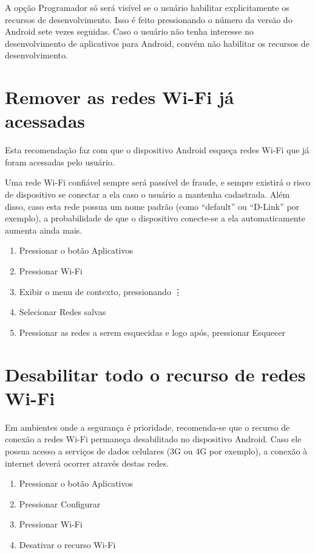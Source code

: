 A op\c c\~ao Programador s\'o ser\'a vis\'ivel se o usu\'ario habilitar explicitamente os recursos de desenvolvimento. Isso \'e feito pressionando o n\'umero da vers\~ao do Android sete vezes seguidas. Caso o usu\'ario n\~ao tenha interesse no desenvolvimento de aplicativos para Android, conv\'em n\~ao habilitar os recursos de desenvolvimento.

\section{Remover as redes Wi-Fi j\'a acessadas}

Esta recomenda\c c\~ao faz com que o dispositivo Android esque\c ca redes Wi-Fi que j\'a foram acessadas pelo usu\'ario. 

Uma rede Wi-Fi confi\'avel sempre ser\'a pass\'ivel de fraude, e sempre existir\'a o risco de dispositivo se conectar a ela caso o usu\'ario a mantenha cadastrada. Al\'em disso, caso esta rede possua um nome padr\~ao (como ``default'' ou ``D-Link'' por exemplo), a probabilidade de que o dispositivo conecte-se a ela automaticamente aumenta ainda mais.

\begin{enumerate}
\item Pressionar o bot\~ao Aplicativos
\item Pressionar Wi-Fi
\item Exibir o menu de contexto, pressionando \vdots
\item Selecionar Redes salvas
\item Pressionar as redes a serem esquecidas e logo ap\'os, pressionar Esquecer
\end{enumerate}

\section{Desabilitar todo o recurso de redes Wi-Fi}

Em ambientes onde a seguran\c ca \'e prioridade, recomenda-se que o recurso de conex\~ao a redes Wi-Fi permane\c ca desabilitado no dispositivo Android. Caso ele possua acesso a servi\c cos de dados celulares (3G ou 4G por exemplo), a conex\~ao \`a internet dever\'a ocorrer atrav\'es destas redes.

\begin{enumerate}
\item Pressionar o bot\~ao Aplicativos
\item Pressionar Configurar
\item Pressionar Wi-Fi
\item Desativar o recurso Wi-Fi
\end{enumerate}

